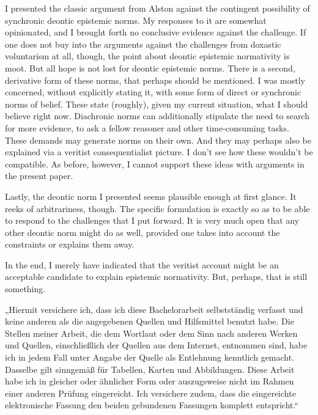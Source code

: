 \documentclass[12pt,numbers=noenddot]{scrartcl}
\begin{document}
I presented the classic argument from Alston against the contingent possibility of synchronic deontic epistemic norms. My responses to it are somewhat opinionated, and I brought forth no conclusive evidence against the challenge. If one does not buy into the arguments against the challenges from doxastic voluntarism at all, though, the point about deontic epistemic normativity is moot. But all hope is not lost for deontic epistemic norms. There is a second, derivative form of these norms, that perhaps should be mentioned. I was mostly concerned, without explicitly stating it, with some form of direct or synchronic norms of belief. These state (roughly), given my current situation, what I should believe right now. Diachronic norms can additionally stipulate the need to search for more evidence, to ask a fellow reasoner and other time-consuming tasks. These demands may generate norms on their own. And they may perhaps also be explained via a veritist consequentialist picture. I don't see how these wouldn't be compatible. As before, however, I cannot support these ideas with arguments in the present paper.

Lastly, the deontic norm I presented seems plausible enough at first glance. It reeks of arbitrariness, though. The specific formulation is exactly so as to be able to respond to the challenges that I put forward. It is very much open that any other deontic norm might do as well, provided one takes into account the constraints or explains them away. 

In the end, I merely have indicated that the veritist account might be an acceptable candidate to explain epistemic normativity. But, perhaps, that is still something.

\printbibliography

\clearpage
\begin{center}
    „Hiermit versichere ich, dass ich diese Bachelorarbeit selbstständig verfasst und keine anderen als die angegebenen Quellen und Hilfsmittel benutzt habe. Die Stellen meiner Arbeit, die dem Wortlaut oder dem Sinn nach anderen Werken und Quellen, einschließlich der Quellen aus dem Internet, entnommen sind, habe ich in jedem Fall unter Angabe der Quelle als Entlehnung kenntlich gemacht. Dasselbe gilt sinngemäß für Tabellen, Karten und Abbildungen. Diese Arbeit habe ich in gleicher oder ähnlicher Form oder auszugsweise nicht im Rahmen einer anderen Prüfung eingereicht. Ich versichere zudem, dass die eingereichte elektronische Fassung den beiden gebundenen Fassungen komplett entspricht.“
\end{center}
\end{document}
